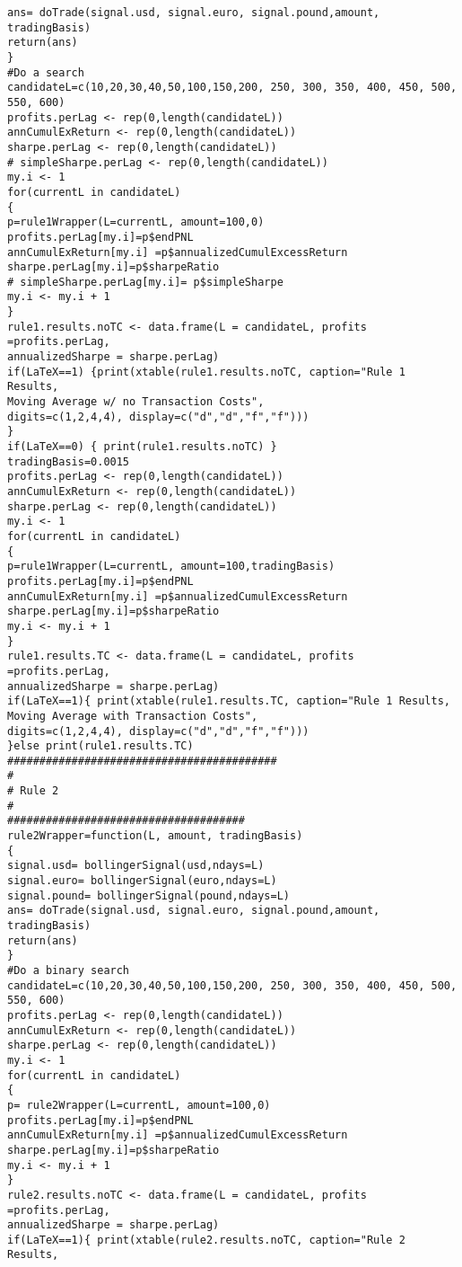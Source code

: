 \begin{small}
\begin{lstlisting}
ans= doTrade(signal.usd, signal.euro, signal.pound,amount, tradingBasis)
return(ans)
}
#Do a search
candidateL=c(10,20,30,40,50,100,150,200, 250, 300, 350, 400, 450, 500, 550, 600)
profits.perLag <- rep(0,length(candidateL))
annCumulExReturn <- rep(0,length(candidateL))
sharpe.perLag <- rep(0,length(candidateL))
# simpleSharpe.perLag <- rep(0,length(candidateL))
my.i <- 1
for(currentL in candidateL)
{
p=rule1Wrapper(L=currentL, amount=100,0)
profits.perLag[my.i]=p$endPNL
annCumulExReturn[my.i] =p$annualizedCumulExcessReturn
sharpe.perLag[my.i]=p$sharpeRatio
# simpleSharpe.perLag[my.i]= p$simpleSharpe
my.i <- my.i + 1
}
rule1.results.noTC <- data.frame(L = candidateL, profits =profits.perLag,
annualizedSharpe = sharpe.perLag)
if(LaTeX==1) {print(xtable(rule1.results.noTC, caption="Rule 1 Results, 
Moving Average w/ no Transaction Costs",
digits=c(1,2,4,4), display=c("d","d","f","f")))
}
if(LaTeX==0) { print(rule1.results.noTC) }
tradingBasis=0.0015
profits.perLag <- rep(0,length(candidateL))
annCumulExReturn <- rep(0,length(candidateL))
sharpe.perLag <- rep(0,length(candidateL))
my.i <- 1
for(currentL in candidateL)
{
p=rule1Wrapper(L=currentL, amount=100,tradingBasis)
profits.perLag[my.i]=p$endPNL
annCumulExReturn[my.i] =p$annualizedCumulExcessReturn
sharpe.perLag[my.i]=p$sharpeRatio
my.i <- my.i + 1
}
rule1.results.TC <- data.frame(L = candidateL, profits =profits.perLag,
annualizedSharpe = sharpe.perLag)
if(LaTeX==1){ print(xtable(rule1.results.TC, caption="Rule 1 Results, 
Moving Average with Transaction Costs",
digits=c(1,2,4,4), display=c("d","d","f","f")))
}else print(rule1.results.TC)
##########################################
#
# Rule 2
#
#####################################
rule2Wrapper=function(L, amount, tradingBasis)
{
signal.usd= bollingerSignal(usd,ndays=L)
signal.euro= bollingerSignal(euro,ndays=L)
signal.pound= bollingerSignal(pound,ndays=L)
ans= doTrade(signal.usd, signal.euro, signal.pound,amount, tradingBasis)
return(ans)
}
#Do a binary search
candidateL=c(10,20,30,40,50,100,150,200, 250, 300, 350, 400, 450, 500, 550, 600)
profits.perLag <- rep(0,length(candidateL))
annCumulExReturn <- rep(0,length(candidateL))
sharpe.perLag <- rep(0,length(candidateL))
my.i <- 1
for(currentL in candidateL)
{
p= rule2Wrapper(L=currentL, amount=100,0)
profits.perLag[my.i]=p$endPNL
annCumulExReturn[my.i] =p$annualizedCumulExcessReturn
sharpe.perLag[my.i]=p$sharpeRatio
my.i <- my.i + 1
}
rule2.results.noTC <- data.frame(L = candidateL, profits =profits.perLag,
annualizedSharpe = sharpe.perLag)
if(LaTeX==1){ print(xtable(rule2.results.noTC, caption="Rule 2 Results, 

\end{lstlisting}
\end{small}
